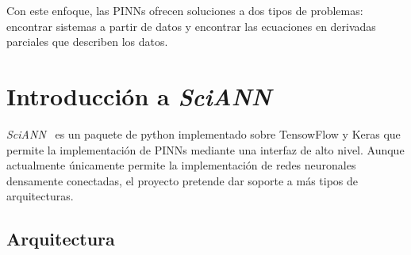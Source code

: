 Con este enfoque, las PINNs ofrecen soluciones a dos tipos de problemas: encontrar sistemas a partir de datos y encontrar las ecuaciones en derivadas parciales que describen los datos. 

\section{Introducción a \textit{SciANN}}

\textit{SciANN}~\cite{Haghighat2021} es un paquete de python implementado sobre TensowFlow y Keras que permite la implementación de PINNs mediante una interfaz de alto nivel. Aunque actualmente únicamente permite la implementación de redes neuronales densamente conectadas, el proyecto pretende dar soporte a más tipos de arquitecturas. 


\subsection{Arquitectura}

